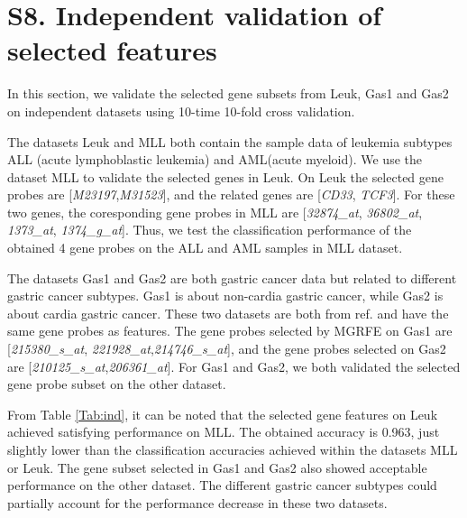 \documentclass[10pt,journal,compsoc]{IEEEtran}
\begin{document}
	\section*{S8. Independent validation of selected features}
	In this section, we validate the selected gene subsets from Leuk, Gas1 and Gas2 on independent datasets using 10-time 10-fold cross validation.

	The datasets Leuk and MLL both contain the sample data of leukemia subtypes ALL (acute lymphoblastic leukemia) and AML(acute myeloid). We use the dataset MLL to validate the selected genes in Leuk. On Leuk the selected gene probes are [\textit{M23197},\textit{M31523}], and the related genes are [\textit{CD33}, \textit{TCF3}]. For these two genes, the coresponding gene probes in MLL are [\textit{32874\_at}, \textit{36802\_at}, \textit{1373\_at}, \textit{1374\_g\_at}]. Thus, we test the classification performance of the obtained 4 gene probes on the ALL and AML samples in MLL dataset.

	The datasets Gas1 and Gas2 are both gastric cancer data but related to different gastric cancer subtypes. Gas1 is about non-cardia gastric cancer, while Gas2 is about cardia gastric cancer. These two datasets are both from ref. \cite{Y30} and have the same gene probes as features. The gene probes selected by MGRFE on Gas1 are [\textit{215380\_s\_at}, \textit{221928\_at},\textit{214746\_s\_at}], and the gene probes selected on Gas2 are [\textit{210125\_s\_at},\textit{206361\_at}]. For Gas1 and Gas2, we both validated the selected gene probe subset on the other dataset.

	From Table \ref{Tab:ind}, it can be noted that the selected gene features on Leuk achieved satisfying performance on MLL. The obtained accuracy is 0.963, just slightly lower than the classification accuracies achieved within the datasets MLL or Leuk. The gene subset selected in Gas1 and Gas2 also showed acceptable performance on the other dataset. The different gastric cancer subtypes could partially account for the performance decrease in these two datasets. 
\end{document}
